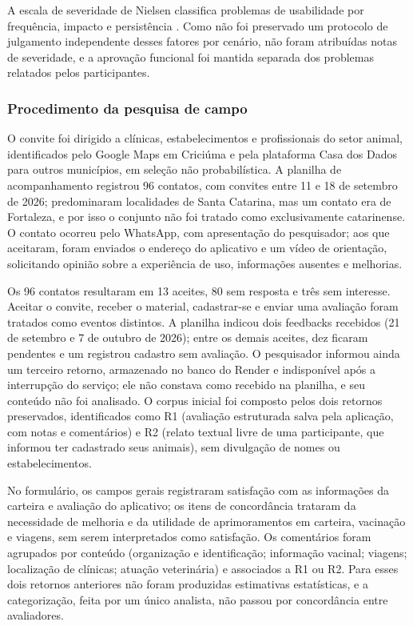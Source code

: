 \documentclass{UNESC}
\begin{document}
A escala de severidade de Nielsen classifica problemas de usabilidade por frequência, impacto e persistência \cite{nielsen1994}. Como não foi preservado um protocolo de julgamento independente desses fatores por cenário, não foram atribuídas notas de severidade, e a aprovação funcional foi mantida separada dos problemas relatados pelos participantes.

\subsubsection{Procedimento da pesquisa de campo}

O convite foi dirigido a clínicas, estabelecimentos e profissionais do setor animal, identificados pelo Google Maps em Criciúma e pela plataforma Casa dos Dados para outros municípios, em seleção não probabilística. A planilha de acompanhamento registrou 96 contatos, com convites entre 11 e 18 de setembro de 2026; predominaram localidades de Santa Catarina, mas um contato era de Fortaleza, e por isso o conjunto não foi tratado como exclusivamente catarinense. O contato ocorreu pelo WhatsApp, com apresentação do pesquisador; aos que aceitaram, foram enviados o endereço do aplicativo e um vídeo de orientação, solicitando opinião sobre a experiência de uso, informações ausentes e melhorias.

Os 96 contatos resultaram em 13 aceites, 80 sem resposta e três sem interesse. Aceitar o convite, receber o material, cadastrar-se e enviar uma avaliação foram tratados como eventos distintos. A planilha indicou dois feedbacks recebidos (21 de setembro e 7 de outubro de 2026); entre os demais aceites, dez ficaram pendentes e um registrou cadastro sem avaliação. O pesquisador informou ainda um terceiro retorno, armazenado no banco do Render e indisponível após a interrupção do serviço; ele não constava como recebido na planilha, e seu conteúdo não foi analisado. O corpus inicial foi composto pelos dois retornos preservados, identificados como R1 (avaliação estruturada salva pela aplicação, com notas e comentários) e R2 (relato textual livre de uma participante, que informou ter cadastrado seus animais), sem divulgação de nomes ou estabelecimentos.

No formulário, os campos gerais registraram satisfação com as informações da carteira e avaliação do aplicativo; os itens de concordância trataram da necessidade de melhoria e da utilidade de aprimoramentos em carteira, vacinação e viagens, sem serem interpretados como satisfação. Os comentários foram agrupados por conteúdo (organização e identificação; informação vacinal; viagens; localização de clínicas; atuação veterinária) e associados a R1 ou R2. Para esses dois retornos anteriores não foram produzidas estimativas estatísticas, e a categorização, feita por um único analista, não passou por concordância entre avaliadores.
\end{document}
